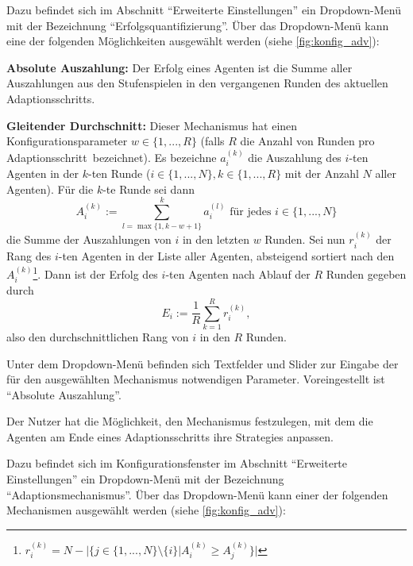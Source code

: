 \documentclass[parskip=full,11pt]{scrartcl}
\def\adapt{Adaptionsschritt}
\begin{document}
Dazu befindet sich im Abschnitt \enquote{Erweiterte Einstellungen} ein Dropdown-Menü mit der Bezeichnung \enquote{Erfolgsquantifizierung}. Über das Dropdown-Menü kann eine der folgenden Möglichkeiten ausgewählt werden (siehe \cref{fig:konfig_adv}):

\textbf{Absolute Auszahlung:}
Der Erfolg eines Agenten ist die Summe aller Auszahlungen aus den Stufenspielen in den vergangenen Runden des aktuellen \adapt s.

\textbf{Gleitender Durchschnitt:}
Dieser Mechanismus hat einen Konfigurationsparameter \(w \in \{1,...,R\}\) (falls \(R\) die Anzahl von Runden pro \adapt\ bezeichnet). Es bezeichne \(a_i^{(k)}\) die Auszahlung des \(i\)-ten Agenten in der \(k\)-ten Runde (\(i \in \{1,...,N\}, k \in \{1,...,R\}\) mit der Anzahl \(N\) aller Agenten). Für die \(k\)-te Runde sei dann
\[
A_i^{(k)} := \sum_{l = \max\{1,k-w+1\}}^k a_i^{(l)} \text{  für jedes  } i \in \{1,...,N\}
\]
die Summe der Auszahlungen von \(i\) in den letzten \(w\) Runden. Sei nun \(r_i^{(k)}\) der Rang des \(i\)-ten Agenten in der Liste aller Agenten, absteigend sortiert nach den \(A_i^{(k)}\)\footnote{\(r_i^{(k)} = N - |\{j \in \{1,...,N\} \setminus \{i\} | A_i^{(k)} \geq A_j^{(k)}\}|\)}. Dann ist der Erfolg des \(i\)-ten Agenten nach Ablauf der \(R\) Runden gegeben durch
\[
E_i := \frac 1R \sum_{k=1}^R r_i^{(k)},
\]
also den durchschnittlichen Rang von \(i\) in den \(R\) Runden.

Unter dem Dropdown-Menü befinden sich Textfelder und Slider zur Eingabe der für den ausgewählten Mechanismus notwendigen Parameter. Voreingestellt ist \enquote{Absolute Auszahlung}.

Der \Gls{Nutzer} hat die Möglichkeit, den Mechanismus festzulegen, mit dem die Agenten am Ende eines \adapt s ihre \Glspl{Strategie} anpassen.

Dazu befindet sich im Konfigurationsfenster im Abschnitt \enquote{Erweiterte Einstellungen} ein Dropdown-Menü mit der Bezeichnung \enquote{Adaptionsmechanismus}. Über das Dropdown-Menü kann einer der folgenden Mechanismen ausgewählt werden (siehe \cref{fig:konfig_adv}):
\end{document}
